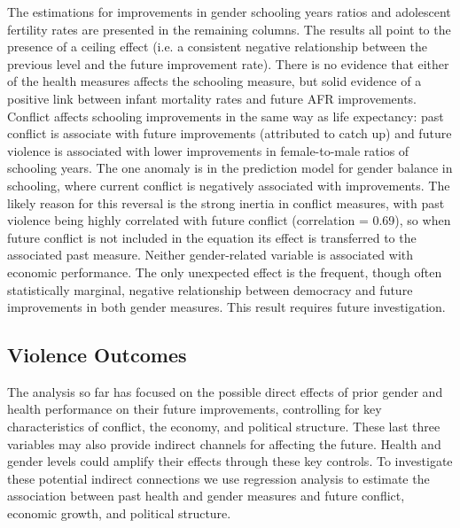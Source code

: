 \documentclass[12pt]{article}
\begin{document}
The estimations for improvements in gender schooling years ratios and adolescent fertility rates are presented in the remaining columns. The results all point to the presence of a ceiling effect (i.e. a consistent negative relationship between the previous level and the future improvement rate). There is no evidence that either of the health measures affects the schooling measure, but solid evidence of a positive link between infant mortality rates and future AFR improvements. Conflict affects schooling improvements in the same way as life expectancy: past conflict is associate with future improvements (attributed to catch up) and future violence is associated with lower improvements in female-to-male ratios of schooling years. The one anomaly is in the prediction model for gender balance in schooling, where current conflict is negatively associated with improvements. The likely reason for this reversal is the strong inertia in conflict measures, with past violence being highly correlated with future conflict (correlation = 0.69), so when future conflict is not included in the equation its effect is transferred to the associated past measure. Neither gender-related variable is associated with economic performance. The only unexpected effect is the frequent, though often statistically marginal, negative relationship between democracy and future improvements in both gender measures. This result requires future investigation.

\subsection{Violence Outcomes}

The analysis so far has focused on the possible direct effects of prior gender and health performance on their future improvements, controlling for key characteristics of conflict, the economy, and political structure. These last three variables may also provide indirect channels for affecting the future. Health and gender levels could amplify their effects through these key controls. To investigate these potential indirect connections we use regression analysis to estimate the association between past health and gender measures and future conflict, economic growth, and political structure.


\end{document}
